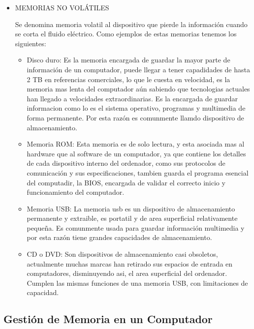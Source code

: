 \documentclass{article}
\begin{document}
\begin{itemize}
\begin{itemize}
    \end{itemize}
    
    \item
    MEMORIAS NO VOLÁTILES
    
    Se denomina memoria volatil al dispositivo que pierde la información cuando se corta el fluido eléctrico. Como ejemplos de estas memorias tenemos los siguientes:
    \begin{itemize}
        \item
        Disco duro: Es la memoria encargada de guardar la mayor parte de información de un computador, puede llegar a tener capadidades de hasta 2 TB en referencias comerciales, lo que le cuesta en velocidad, es la memoria mas lenta del computador aún sabiendo que tecnologias actuales han llegado a velocidades extraordinarias. Es la encargada de guardar informacion como lo es el sistema operativo, programas y multimedia de forma permanente. Por esta razón es comunmente llamdo dispositivo de almacenamiento.
        
        \item
        Memoria ROM: Esta memoria es de solo lectura, y esta asociada mas al hardware que al software de un computador, ya que contiene los detalles de cada dispositivo interno del ordenador, como sus protocolos de comunicación y sus especificaciones, tambien guarda el programa esencial del computadir, la BIOS, encargada de validar el correcto inicio y funcionamiento del computador.
        
        \item
        Memoria USB: La memoria usb es un dispositivo de almacenamiento permanente y extraible, es portatil y de area superficial relativamente pequeña. Es comunmente usada para guardar información multimedia y por esta razón tiene grandes capacidades de almacenamiento.
        
        
        \item
        CD o DVD: Son dispositivos de almacenamiento casi obsoletos, actualmente muchas marcas han retirado sus espacios de entrada en computadores, disminuyendo asi, el area superficial del ordenador. Cumplen las mismas funciones de una memoria USB, con limitaciones de capacidad.
    
    \end{itemize}
    
    
\end{itemize}

\subsection{Gestión de Memoria en un Computador}\label{pregunta3}
\end{document}
